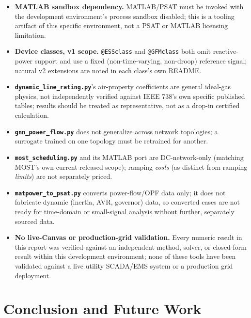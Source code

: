 \documentclass[11pt]{report}
\newcommand{\pkg}[1]{\texttt{#1}}
\theoremstyle{plain}
\theoremstyle{definition}
\theoremstyle{remark}
\begin{document}
\begin{itemize}
\item \textbf{MATLAB sandbox dependency.} MATLAB/PSAT must be invoked
  with the development environment's process sandbox disabled; this is a
  tooling artifact of this specific environment, not a PSAT or MATLAB
  licensing limitation.
\item \textbf{Device classes, v1 scope.} \pkg{@ESSclass} and
  \pkg{@GFMclass} both omit reactive-power support and use a fixed
  (non-time-varying, non-droop) reference signal; natural v2 extensions
  are noted in each class's own README.
\item \textbf{\pkg{dynamic\_\hspace{0pt}line\_\hspace{0pt}rating.py}}'s air-property coefficients
  are general ideal-gas physics, not independently verified against IEEE
  738's own specific published tables; results should be treated as
  representative, not as a drop-in certified calculation.
\item \textbf{\pkg{gnn\_\hspace{0pt}power\_\hspace{0pt}flow.py}} does not generalize across
  network topologies; a surrogate trained on one topology must be
  retrained for another.
\item \textbf{\pkg{most\_\hspace{0pt}scheduling.py}} and its MATLAB port are
  DC-network-only (matching MOST's own current released scope); ramping
  \emph{costs} (as distinct from ramping \emph{limits}) are not
  separately priced.
\item \textbf{\pkg{matpower\_\hspace{0pt}to\_\hspace{0pt}psat.py}} converts power-flow/OPF data
  only; it does not fabricate dynamic (inertia, AVR, governor) data, so
  converted cases are not ready for time-domain or small-signal analysis
  without further, separately sourced data.
\item \textbf{No live-Canvas or production-grid validation.} Every
  numeric result in this report was verified against an independent
  method, solver, or closed-form result within this development
  environment; none of these tools have been validated against a live
  utility SCADA/EMS system or a production grid deployment.
\end{itemize}

\chapter{Conclusion and Future Work}
\label{ch:conclusion}
\end{document}
